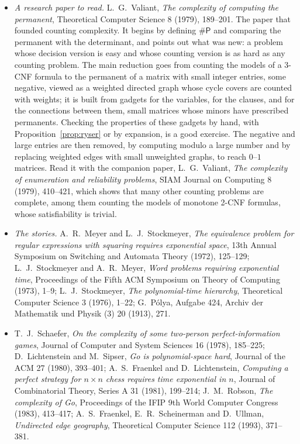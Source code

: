 \begin{itemize}
\item \emph{A research paper to read.} L.~G.~Valiant, \emph{The complexity of computing the permanent}, Theoretical Computer Science 8 (1979), 189--201. The paper that founded counting complexity. It begins by defining $\#\mathsf P$ and comparing the permanent with the determinant, and points out what was new: a problem whose decision version is easy and whose counting version is as hard as any counting problem. The main reduction goes from counting the models of a 3-CNF formula to the permanent of a matrix with small integer entries, some negative, viewed as a weighted directed graph whose cycle covers are counted with weights; it is built from gadgets for the variables, for the clauses, and for the connections between them, small matrices whose minors have prescribed permanents. Checking the properties of these gadgets by hand, with Proposition~\ref{prop:ryser} or by expansion, is a good exercise. The negative and large entries are then removed, by computing modulo a large number and by replacing weighted edges with small unweighted graphs, to reach $0$--$1$ matrices. Read it with the companion paper, L.~G.~Valiant, \emph{The complexity of enumeration and reliability problems}, SIAM Journal on Computing 8 (1979), 410--421, which shows that many other counting problems are complete, among them counting the models of monotone 2-CNF formulas, whose satisfiability is trivial.
\item \emph{The stories.} A.~R.~Meyer and L.~J.~Stockmeyer, \emph{The equivalence problem for regular expressions with squaring requires exponential space}, 13th Annual Symposium on Switching and Automata Theory (1972), 125--129; L.~J.~Stockmeyer and A.~R.~Meyer, \emph{Word problems requiring exponential time}, Proceedings of the Fifth ACM Symposium on Theory of Computing (1973), 1--9; L.~J.~Stockmeyer, \emph{The polynomial-time hierarchy}, Theoretical Computer Science 3 (1976), 1--22; G.~Pólya, Aufgabe 424, Archiv der Mathematik und Physik (3) 20 (1913), 271.
\item T.~J.~Schaefer, \emph{On the complexity of some two-person perfect-information games}, Journal of Computer and System Sciences 16 (1978), 185--225; D.~Lichtenstein and M.~Sipser, \emph{Go is polynomial-space hard}, Journal of the ACM 27 (1980), 393--401; A.~S.~Fraenkel and D.~Lichtenstein, \emph{Computing a perfect strategy for $n\times n$ chess requires time exponential in $n$}, Journal of Combinatorial Theory, Series A 31 (1981), 199--214; J.~M.~Robson, \emph{The complexity of Go}, Proceedings of the IFIP 9th World Computer Congress (1983), 413--417; A.~S.~Fraenkel, E.~R.~Scheinerman and D.~Ullman, \emph{Undirected edge geography}, Theoretical Computer Science 112 (1993), 371--381.

\end{itemize}
